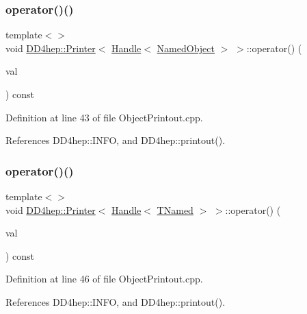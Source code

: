 \subsubsection{\texorpdfstring{operator()()}{operator()()}\hspace{0.1cm}{\footnotesize\ttfamily [1/12]}}
{\footnotesize\ttfamily template$<$$>$ \\
void \hyperlink{struct_d_d4hep_1_1_printer}{D\+D4hep\+::\+Printer}$<$ \hyperlink{class_d_d4hep_1_1_handle}{Handle}$<$ \hyperlink{class_d_d4hep_1_1_named_object}{Named\+Object} $>$ $>$\+::operator() (\begin{DoxyParamCaption}\item[{const \hyperlink{class_d_d4hep_1_1_handle}{Handle}$<$ \hyperlink{class_d_d4hep_1_1_named_object}{Named\+Object} $>$ \&}]{val }\end{DoxyParamCaption}) const}



Definition at line 43 of file Object\+Printout.\+cpp.



References D\+D4hep\+::\+I\+N\+FO, and D\+D4hep\+::printout().

\hypertarget{struct_d_d4hep_1_1_printer_a2e92e9fc7a6049c627b1d67fd4fe16e1}{}\label{struct_d_d4hep_1_1_printer_a2e92e9fc7a6049c627b1d67fd4fe16e1} 
\subsubsection{\texorpdfstring{operator()()}{operator()()}\hspace{0.1cm}{\footnotesize\ttfamily [2/12]}}
{\footnotesize\ttfamily template$<$$>$ \\
void \hyperlink{struct_d_d4hep_1_1_printer}{D\+D4hep\+::\+Printer}$<$ \hyperlink{class_d_d4hep_1_1_handle}{Handle}$<$ \hyperlink{class_t_named}{T\+Named} $>$ $>$\+::operator() (\begin{DoxyParamCaption}\item[{const \hyperlink{class_d_d4hep_1_1_handle}{Handle}$<$ \hyperlink{class_t_named}{T\+Named} $>$ \&}]{val }\end{DoxyParamCaption}) const}



Definition at line 46 of file Object\+Printout.\+cpp.



References D\+D4hep\+::\+I\+N\+FO, and D\+D4hep\+::printout().

